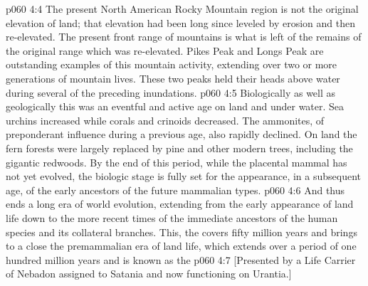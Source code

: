 \vs p060 4:4 The present North American Rocky Mountain region is not the original elevation of land; that elevation had been long since leveled by erosion and then re\hyp{}elevated. The present front range of mountains is what is left of the remains of the original range which was re\hyp{}elevated. Pikes Peak and Longs Peak are outstanding examples of this mountain activity, extending over two or more generations of mountain lives. These two peaks held their heads above water during several of the preceding inundations.
\vs p060 4:5 Biologically as well as geologically this was an eventful and active age on land and under water. Sea urchins increased while corals and crinoids decreased. The ammonites, of preponderant influence during a previous age, also rapidly declined. On land the fern forests were largely replaced by pine and other modern trees, including the gigantic redwoods. By the end of this period, while the placental mammal has not yet evolved, the biologic stage is fully set for the appearance, in a subsequent age, of the early ancestors of the future mammalian types.
\vs p060 4:6 \pc And thus ends a long era of world evolution, extending from the early appearance of land life down to the more recent times of the immediate ancestors of the human species and its collateral branches. This, the  covers fifty million years and brings to a close the premammalian era of land life, which extends over a period of one hundred million years and is known as the 
\vsetoff
\vs p060 4:7 [Presented by a Life Carrier of Nebadon assigned to Satania and now functioning on Urantia.]
